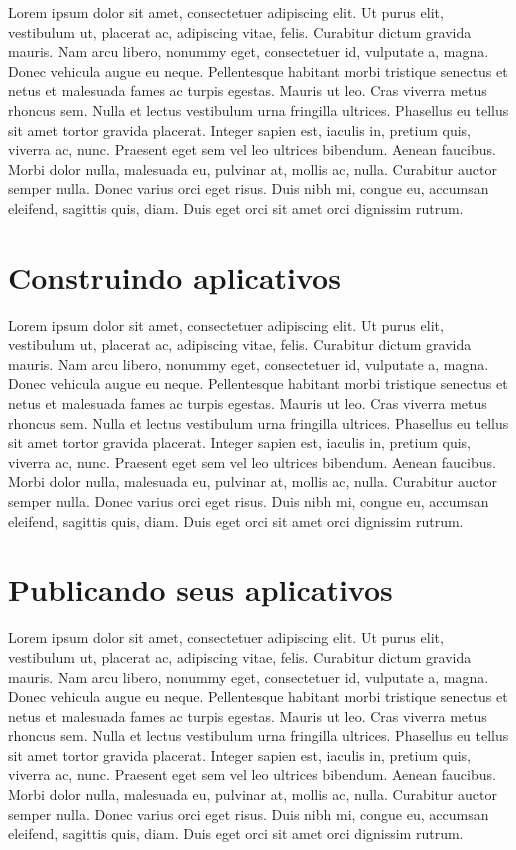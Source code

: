 \documentclass[]{book}
\begin{document}
Lorem ipsum dolor sit amet, consectetuer adipiscing elit. Ut purus elit,
vestibulum ut, placerat ac, adipiscing vitae, felis. Curabitur dictum
gravida mauris. Nam arcu libero, nonummy eget, consectetuer id,
vulputate a, magna. Donec vehicula augue eu neque. Pellentesque habitant
morbi tristique senectus et netus et malesuada fames ac turpis egestas.
Mauris ut leo. Cras viverra metus rhoncus sem. Nulla et lectus
vestibulum urna fringilla ultrices. Phasellus eu tellus sit amet tortor
gravida placerat. Integer sapien est, iaculis in, pretium quis, viverra
ac, nunc. Praesent eget sem vel leo ultrices bibendum. Aenean faucibus.
Morbi dolor nulla, malesuada eu, pulvinar at, mollis ac, nulla.
Curabitur auctor semper nulla. Donec varius orci eget risus. Duis nibh
mi, congue eu, accumsan eleifend, sagittis quis, diam. Duis eget orci
sit amet orci dignissim rutrum.

\chapter{Construindo aplicativos}\label{construindo-aplicativos}

Lorem ipsum dolor sit amet, consectetuer adipiscing elit. Ut purus elit,
vestibulum ut, placerat ac, adipiscing vitae, felis. Curabitur dictum
gravida mauris. Nam arcu libero, nonummy eget, consectetuer id,
vulputate a, magna. Donec vehicula augue eu neque. Pellentesque habitant
morbi tristique senectus et netus et malesuada fames ac turpis egestas.
Mauris ut leo. Cras viverra metus rhoncus sem. Nulla et lectus
vestibulum urna fringilla ultrices. Phasellus eu tellus sit amet tortor
gravida placerat. Integer sapien est, iaculis in, pretium quis, viverra
ac, nunc. Praesent eget sem vel leo ultrices bibendum. Aenean faucibus.
Morbi dolor nulla, malesuada eu, pulvinar at, mollis ac, nulla.
Curabitur auctor semper nulla. Donec varius orci eget risus. Duis nibh
mi, congue eu, accumsan eleifend, sagittis quis, diam. Duis eget orci
sit amet orci dignissim rutrum.

\chapter{Publicando seus aplicativos}\label{publicando-seus-aplicativos}

Lorem ipsum dolor sit amet, consectetuer adipiscing elit. Ut purus elit,
vestibulum ut, placerat ac, adipiscing vitae, felis. Curabitur dictum
gravida mauris. Nam arcu libero, nonummy eget, consectetuer id,
vulputate a, magna. Donec vehicula augue eu neque. Pellentesque habitant
morbi tristique senectus et netus et malesuada fames ac turpis egestas.
Mauris ut leo. Cras viverra metus rhoncus sem. Nulla et lectus
vestibulum urna fringilla ultrices. Phasellus eu tellus sit amet tortor
gravida placerat. Integer sapien est, iaculis in, pretium quis, viverra
ac, nunc. Praesent eget sem vel leo ultrices bibendum. Aenean faucibus.
Morbi dolor nulla, malesuada eu, pulvinar at, mollis ac, nulla.
Curabitur auctor semper nulla. Donec varius orci eget risus. Duis nibh
mi, congue eu, accumsan eleifend, sagittis quis, diam. Duis eget orci
sit amet orci dignissim rutrum.
\end{document}

